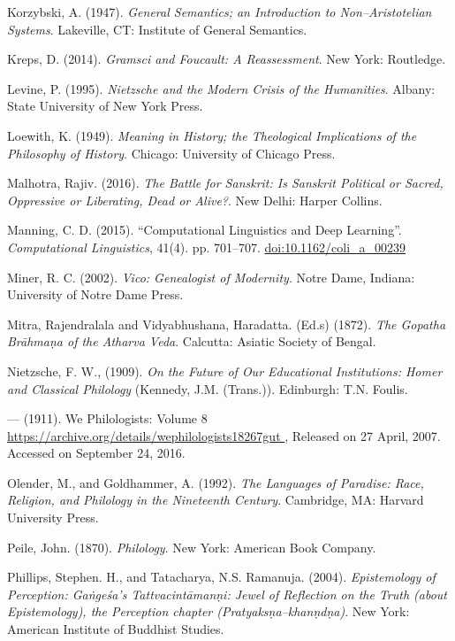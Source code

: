 \begin{thebibliography}{99}
  Korzybski, A. (1947). \textit{General Semantics; an Introduction to Non–Aristotelian Systems}. Lakeville, CT: Institute of General Semantics.

  Kreps, D. (2014). \textit{Gramsci and Foucault: A Reassessment}. New York: Routledge.

  Levine, P. (1995). \textit{Nietzsche and the Modern Crisis of the Humanities}. Albany: State University of New York Press.

  Loewith, K. (1949). \textit{Meaning in History; the Theological Implications of the Philosophy of History}. Chicago: University of Chicago Press.

  Malhotra, Rajiv. (2016). \textit{The Battle for Sanskrit: Is Sanskrit Political or Sacred, Oppressive or Liberating, Dead or Alive?}. New Delhi: Harper Collins.

  Manning, C. D. (2015). “Computational Linguistics and Deep Learning”. \textit{Computational Linguistics}, 41(4). pp. 701–707. \url{doi:10.1162/coli_a_00239}

  Miner, R. C. (2002). \textit{Vico: Genealogist of Modernity}. Notre Dame, Indiana: University of Notre Dame Press.

  Mitra, Rajendralala and Vidyabhushana, Haradatta. (Ed.s) (1872). \textit{The Gopatha Brāhmaṇa of the Atharva Veda}. Calcutta: Asiatic Society of Bengal.

  Nietzsche, F. W., (1909). \textit{On the Future of Our Educational Institutions: Homer and Classical Philology} (Kennedy, J.M. (Trans.)). Edinburgh: T.N. Foulis.

  — (1911). We Philologists: Volume 8 \url{ https://archive.org/details/wephilologists18267gut }, Released on 27 April, 2007. Accessed on September 24, 2016.

  Olender, M., and Goldhammer, A. (1992). \textit{The Languages of Paradise: Race, Religion, and Philology in the Nineteenth Century}. Cambridge, MA: Harvard University Press.

  Peile, John. (1870). \textit{Philology}. New York: American Book Company.

  Phillips, Stephen. H., and Tatacharya, N.S. Ramanuja. (2004). \textit{Epistemology of Perception: Gaṅgeśa's Tattvacintāmanṇi: Jewel of Reflection on the Truth (about Epistemology), the Perception chapter (Pratyaksṇa–khanṇdṇa)}. New York: American Institute of Buddhist Studies.


\end{thebibliography}
